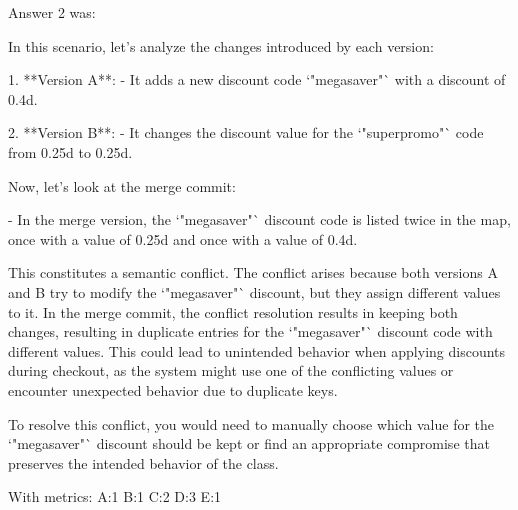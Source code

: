 Answer 2 was:
\begin{spverbatim}
In this scenario, let's analyze the changes introduced by each version:

1. **Version A**:
   - It adds a new discount code `"megasaver"` with a discount of 0.4d.

2. **Version B**:
   - It changes the discount value for the `"superpromo"` code from 0.25d to 0.25d.

Now, let's look at the merge commit:

- In the merge version, the `"megasaver"` discount code is listed twice in the map, once with a value of 0.25d and once with a value of 0.4d.

This constitutes a semantic conflict. The conflict arises because both versions A and B try to modify the `"megasaver"` discount, but they assign different values to it. In the merge commit, the conflict resolution results in keeping both changes, resulting in duplicate entries for the `"megasaver"` discount code with different values. This could lead to unintended behavior when applying discounts during checkout, as the system might use one of the conflicting values or encounter unexpected behavior due to duplicate keys.

To resolve this conflict, you would need to manually choose which value for the `"megasaver"` discount should be kept or find an appropriate compromise that preserves the intended behavior of the class.
\end{spverbatim}

With metrics:
A:1
B:1
C:2
D:3
E:1


